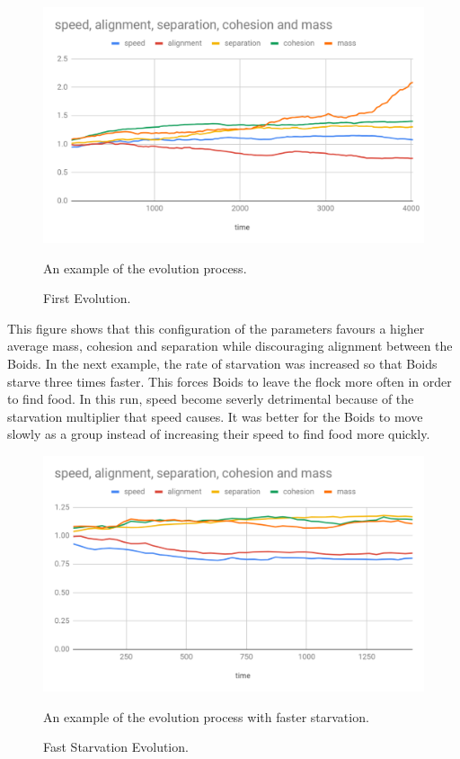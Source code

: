 \documentclass{egpubl}
\begin{document}
\begin{figure}[H]
  \centering
  \includegraphics[width=.8\linewidth]{firstEvolution}
  \parbox[t]{.9\columnwidth}{\relax
    An example of the evolution process.
           }
  \caption{\label{fig:firstEvo}
           First Evolution.}
\end{figure}
This figure shows that this configuration of the parameters favours a higher average mass, cohesion and separation while discouraging alignment between the Boids. In the next example, the rate of starvation was increased so that Boids starve three times faster. This forces Boids to leave the flock more often in order to find food. In this run, speed become severly detrimental because of the starvation multiplier that speed causes. It was better for the Boids to move slowly as a group instead of increasing their speed to find food more quickly.  
\begin{figure}[H]
  \centering
  \includegraphics[width=.8\linewidth]{starvationEvolution}
  \parbox[t]{.9\columnwidth}{\relax
    An example of the evolution process with faster starvation.
           }
  \caption{\label{fig:secondEvo}
           Fast Starvation Evolution.}
\end{figure}
\end{document}

